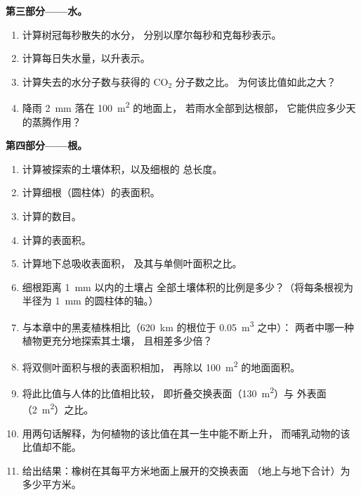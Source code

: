 \begin{problem}
\medskip
\noindent\textbf{第三部分——水。}
\begin{enumerate}[resume]
  \item 计算树冠每秒散失的水分，
        分别以摩尔每秒和克每秒表示。
  \item 计算每日失水量，以升表示。
  \item 计算失去的水分子数与获得的 $\mathrm{CO_2}$ 分子数之比。
        为何该比值如此之大？
  \item 降雨 \qty{2}{mm} 落在 \qty{100}{m^2} 的地面上，
        若雨水全部到达根部，
        它能供应多少天的蒸腾作用？
\end{enumerate}

\medskip
\noindent\textbf{第四部分——根。}
\begin{enumerate}[resume]
  \item 计算被探索的土壤体积，以及细根的
        总长度。
  \item 计算细根（圆柱体）的表面积。
  \item 计算的数目。
  \item 计算的表面积。
  \item 计算地下总吸收表面积，
        及其与单侧叶面积之比。
  \item 细根距离 \qty{1}{mm} 以内的土壤占
        全部土壤体积的比例是多少？（将每条根视为
        半径为 \qty{1}{mm} 的圆柱体的轴。）
  \item 与本章中的黑麦植株相比（\qty{620}{km} 的根位于 \qty{0.05}{m^3} 之中）：
        两者中哪一种植物更充分地探索其土壤，
        且相差多少倍？
  \item 将双侧叶面积与根的表面积相加，
        再除以 \qty{100}{m^2} 的地面面积。
  \item 将此比值与人体的比值相比较，
        即折叠交换表面（\qty{130}{m^2}）与
        外表面（\qty{2}{m^2}）之比。
  \item 用两句话解释，为何植物的该比值在其一生中能不断上升，
        而哺乳动物的该比值却不能。
  \item 给出结果：橡树在其每平方米地面上展开的交换表面
        （地上与地下合计）为多少平方米。
\end{enumerate}
\end{problem}
